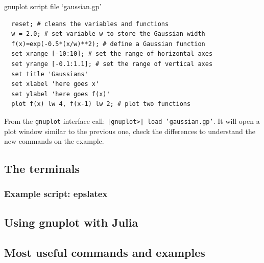 \begin{example}{gnuplot script file `gaussian.gp'}
\begin{verbatim}
  reset; # cleans the variables and functions
  w = 2.0; # set variable w to store the Gaussian width
  f(x)=exp(-0.5*(x/w)**2); # define a Gaussian function
  set xrange [-10:10]; # set the range of horizontal axes
  set yrange [-0.1:1.1]; # set the range of vertical axes
  set title 'Gaussians'
  set xlabel 'here goes x'
  set ylabel 'here goes f(x)'
  plot f(x) lw 4, f(x-1) lw 2; # plot two functions
\end{verbatim}
\end{example}

From the \texttt{gnuplot} interface call: \texttt{|gnuplot>| load 'gaussian.gp'}. It will open a plot window similar to the previous one, check the differences to understand the new commands on the example.

\subsection{The terminals}

\subsubsection{Example script: epslatex}

\subsection{Using gnuplot with Julia}

\subsection{Most useful commands and examples}



